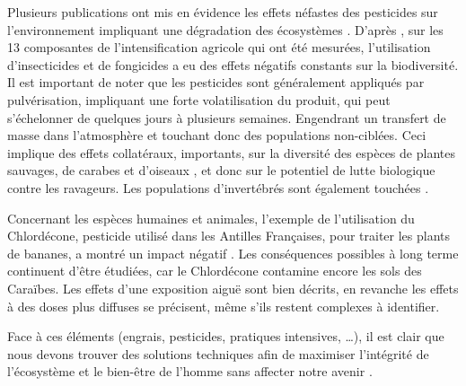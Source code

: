 \documentclass[../thesis.tex]{subfiles}
\begin{document}
    Plusieurs publications ont mis en évidence les effets néfastes des pesticides sur l'environnement \cite{MCLAUGHLIN1995201, vanderwerf1997, Pesce2021} impliquant une dégradation des écosystèmes \cite{aubertot2005pesticides, bianchi2006sustainable}. D'après \cite{GEIGER201097}, sur les 13 composantes de l'intensification agricole qui ont été mesurées, l'utilisation d'insecticides et de fongicides a eu des effets négatifs constants sur la biodiversité. Il est important de noter que les pesticides sont généralement appliqués par pulvérisation, impliquant une forte volatilisation du produit, qui peut s'échelonner de quelques jours à plusieurs semaines. Engendrant un transfert de masse dans l'atmosphère \cite{bedos2002mass} et touchant donc des populations non-ciblées. Ceci implique des effets collatéraux, importants, sur la diversité des espèces de plantes sauvages, de carabes et d'oiseaux \cite{GEIGER201097}, et donc sur le potentiel de lutte biologique contre les ravageurs. Les populations d'invertébrés sont également touchées \cite{Mikhail2013, grozinger2019bee, wood2020managed}. 
    
    Concernant les espèces humaines et animales, l'exemple de l'utilisation du Chlordécone, pesticide utilisé dans les Antilles Françaises, pour traiter les plants de bananes, a montré un impact négatif \cite{DUBUISSON20075, maudouit2019systematic}. Les conséquences possibles à long terme continuent d'être étudiées, car le Chlordécone contamine encore les sols des Caraïbes. Les effets d'une exposition aiguë sont bien décrits, en revanche les effets à des doses plus diffuses se précisent, même s'ils restent complexes à identifier.
    
    Face à ces éléments (engrais, pesticides, pratiques intensives, \dots), \og il est clair que nous devons trouver des solutions techniques afin de maximiser l'intégrité de l'écosystème et le bien-être de l'homme sans affecter notre avenir \fg \cite{dufour2009myth}.
    
    
\end{document}
